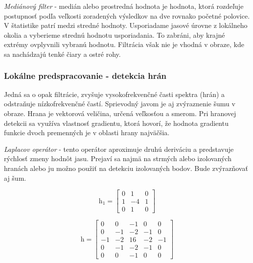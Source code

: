 \textit{Mediánový filter} - medián alebo prostredná hodnota je hodnota, ktorá rozdeľuje postupnosť podľa veľkosti zoradených výsledkov na dve rovnako početné polovice. V štatistike patrí medzi stredné hodnoty. Usporiadame jasové úrovne z lokálneho okolia a vyberieme strednú hodnotu usporiadania. To zabráni, aby krajné extrémy ovplyvnili vybranú hodnotu. Filtrácia však nie je vhodná v obraze, kde sa nachádzajú tenké čiary a ostré rohy. \cite{Detekcia_a_rozpoznavanie_objektov} 


\subsubsection{Lokálne predspracovanie - detekcia hrán}
\label{sec:edge}
Jedná sa o opak filtrácie, zvyšuje vysokofrekvenčné časti spektra (hrán) a odstraňuje nízkofrekvenčné častí. Sprievodný javom je aj zvýraznenie šumu v obraze. Hrana je vektorová veličina, určená veľkosťou a smerom. Pri hranovej detekcii sa využíva vlastnosť gradientu, ktorá hovorí, že hodnota gradientu funkcie dvoch premenných je v oblasti hrany najväčšia. \cite{Learning_openCV}
\vspace{5mm}


\textit{Laplacov operátor} - tento operátor aproximuje druhú deriváciu a predstavuje rýchlosť zmeny hodnôt jasu. Prejaví sa najmä na strmých alebo izolovaných hranách alebo ju možno použiť na detekciu izolovaných bodov. Bude zvýrazňovať aj šum. \cite{Detekcia_a_rozpoznavanie_objektov}\cite{Learning_openCV}

\vspace{5mm}

\begin{figure}[H]
    \centering
    \begin{minipage}[b]{0.49\textwidth}
        \begin{equation}
            \textit{h}_1=\begin{bmatrix} 0 & 1 & 0 \\ 1 & -4 & 1 \\ 0 & 1 & 0  \end{bmatrix}
        \end{equation}
    \end{minipage}
    \hfill
    \begin{minipage}[b]{0.49\textwidth}
        \begin{equation}
            \textit{h}=\begin{bmatrix} 0 & 0 & -1 & 0 & 0 \\ 0 & -1 & -2 & -1 & 0 \\ -1 & -2 & 16 & -2 & -1 \\ 0 & -1 & -2 & -1 & 0 \\ 0 & 0 & -1 & 0 & 0  \end{bmatrix}
        \end{equation}
    \end{minipage}
\end{figure}

